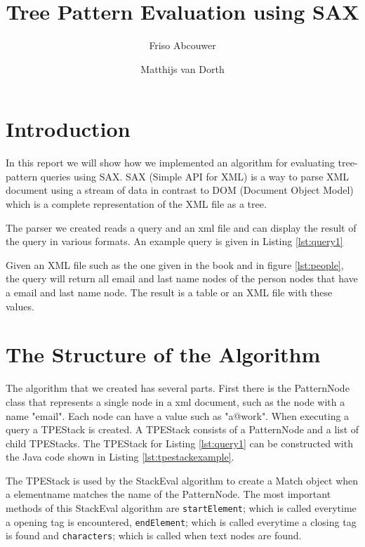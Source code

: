 \documentclass[11pt]{article}
\title{Tree Pattern Evaluation using SAX}
\author{Friso Abcouwer \and Matthijs van Dorth}
\begin{document}
\maketitle

\section{Introduction}
In this report we will show how we implemented an algorithm for evaluating tree-pattern queries using SAX. SAX (Simple API for XML) is a way to parse XML document using a stream of data in contrast to DOM (Document Object Model) which is a complete representation of the XML file as a tree.

The parser we created reads a query and an xml file and can display the result of the query in various formats. An example query is given in Listing \ref{lst:query1}



Given an XML file such as the one given in the book and in figure \ref{lst:people}, the query will return all email and last name nodes of the person nodes that have a email and last name node.
The result is a table or an XML file with these values.



\newpage
\section{The Structure of the Algorithm}
The algorithm that we created has several parts. First there is the PatternNode class that represents a single node in a xml document, such as the node with a name "email". Each node can have a value such as "a@work".
When executing a query a TPEStack is created. A TPEStack consists of a PatternNode and a list of child TPEStacks. The TPEStack for Listing \ref{lst:query1} can be constructed with the Java code shown in Listing \ref{lst:tpestackexample}. 



The TPEStack is used by the StackEval algorithm to create a Match object when a elementname matches the
name of the PatternNode. The most important methods of this StackEval algorithm are \lstinline{startElement}; which is called everytime a opening tag is encountered, \lstinline{endElement}; which is called everytime a closing tag is found and \lstinline{characters}; which is called when text nodes are found. 
\end{document}
